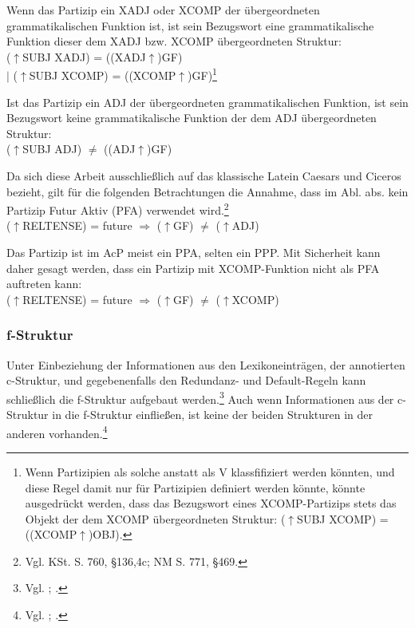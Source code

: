 \documentclass[12pt,a4paper]{article}
\begin{document}
Wenn das Partizip ein XADJ oder XCOMP der übergeordneten grammatikalischen Funktion ist, ist sein Bezugswort eine grammatikalische Funktion dieser dem XADJ bzw. XCOMP übergeordneten Struktur: \\
($\uparrow$SUBJ XADJ) = ((XADJ$\uparrow$)GF) \\
$\mid$ ($\uparrow$SUBJ XCOMP) = ((XCOMP$\uparrow$)GF)\footnote{Wenn Partizipien als solche anstatt als V klassfifiziert werden könnten, und diese Regel damit nur für Partizipien definiert werden könnte, könnte ausgedrückt werden, dass das Bezugswort eines XCOMP-Partizips stets das Objekt der dem XCOMP übergeordneten Struktur: ($\uparrow$SUBJ XCOMP) = ((XCOMP$\uparrow$)OBJ).}

Ist das Partizip ein ADJ der übergeordneten grammatikalischen Funktion, ist sein Bezugswort keine grammatikalische Funktion der dem ADJ übergeordneten Struktur: \\
($\uparrow$SUBJ ADJ) $\neq$ ((ADJ$\uparrow$)GF)

Da sich diese Arbeit ausschließlich auf das klassische Latein Caesars und Ciceros bezieht, gilt für die folgenden Betrachtungen die Annahme, dass im Abl. abs. kein Partizip Futur Aktiv (PFA) verwendet wird.\footnote{Vgl. KSt. S. 760, §136,4c; NM S. 771, §469.}\\
($\uparrow$RELTENSE) = future $\Rightarrow$ ($\uparrow$GF) $\neq$ ($\uparrow$ADJ)

Das Partizip ist im AcP meist ein PPA, selten ein PPP. Mit Sicherheit kann daher gesagt werden, dass ein Partizip mit XCOMP-Funktion nicht als PFA auftreten kann: \\
($\uparrow$RELTENSE) = future $\Rightarrow$ ($\uparrow$GF) $\neq$ ($\uparrow$XCOMP)

\subsubsection{f-Struktur}
Unter Einbeziehung der Informationen aus den Lexikoneinträgen, der annotierten c-Struktur, und gegebenenfalls den Redundanz- und Default-Regeln kann schließlich die f-Struktur aufgebaut werden.\footnote{Vgl. \cite[13; 23]{Rohrer}; \cite[14]{Skript}.} Auch wenn Informationen aus der c-Struktur in die f-Struktur einfließen, ist keine der beiden Strukturen in der anderen vorhanden.\footnote{Vgl. \cite[26-7; 35]{Rohrer}; \cite[8]{Skript}.}
\end{document}
